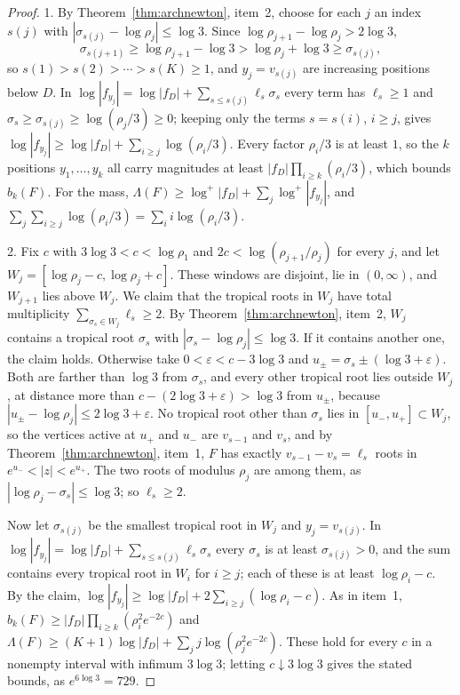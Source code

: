 \documentclass[11pt]{article}
\begin{document}
\begin{proof}
1.  By Theorem~\ref{thm:archnewton}, item~2, choose for each $j$ an index
$s(j)$ with $|\sigma_{s(j)}-\log\rho_j|\le\log3$.  Since
$\log\rho_{j+1}-\log\rho_j>2\log3$,
\[
  \sigma_{s(j+1)}\ge\log\rho_{j+1}-\log3>\log\rho_j+\log3\ge\sigma_{s(j)},
\]
so $s(1)>s(2)>\cdots>s(K)\ge1$, and $y_j=v_{s(j)}$ are increasing positions
below $D$.  In
$\log|f_{y_j}|=\log|f_D|+\sum_{s\le s(j)}\ell_s\sigma_s$ every term has
$\ell_s\ge1$ and $\sigma_s\ge\sigma_{s(j)}\ge\log(\rho_j/3)\ge0$; keeping only
the terms $s=s(i)$, $i\ge j$, gives
$\log|f_{y_j}|\ge\log|f_D|+\sum_{i\ge j}\log(\rho_i/3)$.  Every factor
$\rho_i/3$ is at least $1$, so the $k$ positions $y_1,\ldots,y_k$ all carry
magnitudes at least $|f_D|\prod_{i\ge k}(\rho_i/3)$, which bounds $b_k(F)$.
For the mass, $\Lambda(F)\ge\log^+|f_D|+\sum_j\log^+|f_{y_j}|$, and
$\sum_j\sum_{i\ge j}\log(\rho_i/3)=\sum_ii\log(\rho_i/3)$.

2.  Fix $c$ with $3\log3<c<\log\rho_1$ and $2c<\log(\rho_{j+1}/\rho_j)$ for
every $j$, and let $W_j=[\log\rho_j-c,\log\rho_j+c]$.  These windows are
disjoint, lie in $(0,\infty)$, and $W_{j+1}$ lies above $W_j$.  We claim that
the tropical roots in $W_j$ have total multiplicity
$\sum_{\sigma_s\in W_j}\ell_s\ge2$.  By Theorem~\ref{thm:archnewton}, item~2,
$W_j$ contains a tropical root $\sigma_s$ with $|\sigma_s-\log\rho_j|\le\log3$.
If it contains another one, the claim holds.  Otherwise take
$0<\varepsilon<c-3\log3$ and $u_\pm=\sigma_s\pm(\log3+\varepsilon)$.  Both are
farther than $\log3$ from $\sigma_s$, and every other tropical root lies
outside $W_j$, at distance more than $c-(2\log3+\varepsilon)>\log3$ from
$u_\pm$, because $|u_\pm-\log\rho_j|\le2\log3+\varepsilon$.  No tropical root
other than $\sigma_s$ lies in $[u_-,u_+]\subset W_j$, so the vertices active
at $u_+$ and $u_-$ are $v_{s-1}$ and $v_s$, and by
Theorem~\ref{thm:archnewton}, item~1, $F$ has exactly
$v_{s-1}-v_s=\ell_s$ roots in $e^{u_-}<|z|<e^{u_+}$.  The two roots of modulus
$\rho_j$ are among them, as $|\log\rho_j-\sigma_s|\le\log3$; so $\ell_s\ge2$.

Now let $\sigma_{s(j)}$ be the smallest tropical root in $W_j$ and
$y_j=v_{s(j)}$.  In $\log|f_{y_j}|=\log|f_D|+\sum_{s\le s(j)}\ell_s\sigma_s$
every $\sigma_s$ is at least $\sigma_{s(j)}>0$, and the sum contains every
tropical root in $W_i$ for $i\ge j$; each of these is at least
$\log\rho_i-c$.  By the claim,
$\log|f_{y_j}|\ge\log|f_D|+2\sum_{i\ge j}(\log\rho_i-c)$.  As in item~1,
$b_k(F)\ge|f_D|\prod_{i\ge k}(\rho_i^2e^{-2c})$ and
$\Lambda(F)\ge(K+1)\log|f_D|+\sum_jj\log(\rho_j^2e^{-2c})$.  These hold for
every $c$ in a nonempty interval with infimum $3\log3$; letting
$c\downarrow3\log3$ gives the stated bounds, as $e^{6\log3}=729$.

\end{proof}
\end{document}
